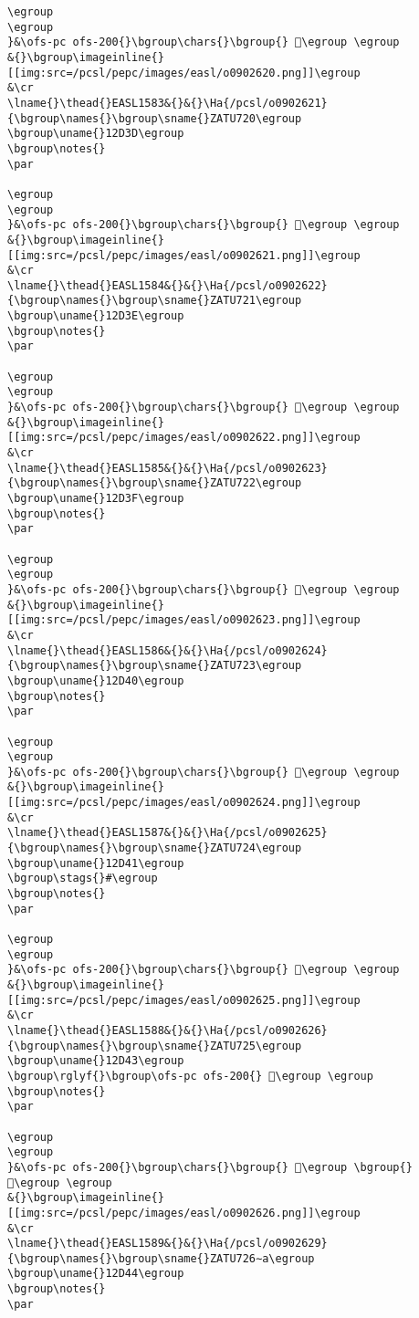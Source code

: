 \begin{verbatim}
\egroup
\egroup
}&\ofs-pc ofs-200{}\bgroup\chars{}\bgroup{} 𒴼\egroup \egroup
&{}\bgroup\imageinline{}[[img:src=/pcsl/pepc/images/easl/o0902620.png]]\egroup
&\cr
\lname{}\thead{}EASL1583&{}&{}\Ha{/pcsl/o0902621}{\bgroup\names{}\bgroup\sname{}ZATU720\egroup
\bgroup\uname{}12D3D\egroup
\bgroup\notes{}
\par 

\egroup
\egroup
}&\ofs-pc ofs-200{}\bgroup\chars{}\bgroup{} 𒴽\egroup \egroup
&{}\bgroup\imageinline{}[[img:src=/pcsl/pepc/images/easl/o0902621.png]]\egroup
&\cr
\lname{}\thead{}EASL1584&{}&{}\Ha{/pcsl/o0902622}{\bgroup\names{}\bgroup\sname{}ZATU721\egroup
\bgroup\uname{}12D3E\egroup
\bgroup\notes{}
\par 

\egroup
\egroup
}&\ofs-pc ofs-200{}\bgroup\chars{}\bgroup{} 𒴾\egroup \egroup
&{}\bgroup\imageinline{}[[img:src=/pcsl/pepc/images/easl/o0902622.png]]\egroup
&\cr
\lname{}\thead{}EASL1585&{}&{}\Ha{/pcsl/o0902623}{\bgroup\names{}\bgroup\sname{}ZATU722\egroup
\bgroup\uname{}12D3F\egroup
\bgroup\notes{}
\par 

\egroup
\egroup
}&\ofs-pc ofs-200{}\bgroup\chars{}\bgroup{} 𒴿\egroup \egroup
&{}\bgroup\imageinline{}[[img:src=/pcsl/pepc/images/easl/o0902623.png]]\egroup
&\cr
\lname{}\thead{}EASL1586&{}&{}\Ha{/pcsl/o0902624}{\bgroup\names{}\bgroup\sname{}ZATU723\egroup
\bgroup\uname{}12D40\egroup
\bgroup\notes{}
\par 

\egroup
\egroup
}&\ofs-pc ofs-200{}\bgroup\chars{}\bgroup{} 𒵀\egroup \egroup
&{}\bgroup\imageinline{}[[img:src=/pcsl/pepc/images/easl/o0902624.png]]\egroup
&\cr
\lname{}\thead{}EASL1587&{}&{}\Ha{/pcsl/o0902625}{\bgroup\names{}\bgroup\sname{}ZATU724\egroup
\bgroup\uname{}12D41\egroup
\bgroup\stags{}#\egroup
\bgroup\notes{}
\par 

\egroup
\egroup
}&\ofs-pc ofs-200{}\bgroup\chars{}\bgroup{} 𒵁\egroup \egroup
&{}\bgroup\imageinline{}[[img:src=/pcsl/pepc/images/easl/o0902625.png]]\egroup
&\cr
\lname{}\thead{}EASL1588&{}&{}\Ha{/pcsl/o0902626}{\bgroup\names{}\bgroup\sname{}ZATU725\egroup
\bgroup\uname{}12D43\egroup
\bgroup\rglyf{}\bgroup\ofs-pc ofs-200{} 𒵃\egroup \egroup
\bgroup\notes{}
\par 

\egroup
\egroup
}&\ofs-pc ofs-200{}\bgroup\chars{}\bgroup{} 𒵂\egroup \bgroup{} 𒵃\egroup \egroup
&{}\bgroup\imageinline{}[[img:src=/pcsl/pepc/images/easl/o0902626.png]]\egroup
&\cr
\lname{}\thead{}EASL1589&{}&{}\Ha{/pcsl/o0902629}{\bgroup\names{}\bgroup\sname{}ZATU726∼a\egroup
\bgroup\uname{}12D44\egroup
\bgroup\notes{}
\par 


\end{verbatim}
